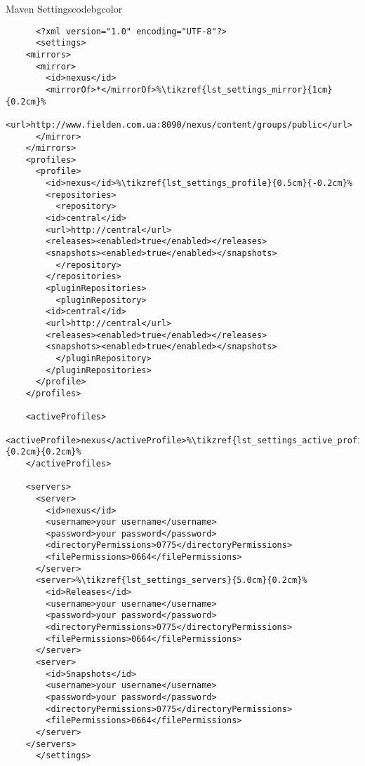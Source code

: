   \begin{code}{Maven Settings}{\label{lst:settings}}{codebgcolor}
    \begin{lstlisting}
      <?xml version="1.0" encoding="UTF-8"?>
      <settings>
	<mirrors>
	  <mirror>
	    <id>nexus</id>
	    <mirrorOf>*</mirrorOf>%\tikzref{lst_settings_mirror}{1cm}{0.2cm}%
	    <url>http://www.fielden.com.ua:8090/nexus/content/groups/public</url>
	  </mirror>
	</mirrors>
	<profiles>
	  <profile>
	    <id>nexus</id>%\tikzref{lst_settings_profile}{0.5cm}{-0.2cm}%
	    <repositories>
	      <repository>
		<id>central</id>
		<url>http://central</url>
		<releases><enabled>true</enabled></releases>
		<snapshots><enabled>true</enabled></snapshots>
	      </repository>
	    </repositories>
	    <pluginRepositories>
	      <pluginRepository>
		<id>central</id>
		<url>http://central</url>
		<releases><enabled>true</enabled></releases>
		<snapshots><enabled>true</enabled></snapshots>
	      </pluginRepository>
	    </pluginRepositories>
	  </profile>
	</profiles>

	<activeProfiles>
	  <activeProfile>nexus</activeProfile>%\tikzref{lst_settings_active_profile}{0.2cm}{0.2cm}%
	</activeProfiles>

	<servers>
	  <server>
	    <id>nexus</id>
	    <username>your username</username>
	    <password>your password</password>
	    <directoryPermissions>0775</directoryPermissions>
	    <filePermissions>0664</filePermissions>
	  </server>
	  <server>%\tikzref{lst_settings_servers}{5.0cm}{0.2cm}%
	    <id>Releases</id>
	    <username>your username</username>
	    <password>your password</password>
	    <directoryPermissions>0775</directoryPermissions>
	    <filePermissions>0664</filePermissions>
	  </server>
	  <server>
	    <id>Snapshots</id>
	    <username>your username</username>
	    <password>your password</password>
	    <directoryPermissions>0775</directoryPermissions>
	    <filePermissions>0664</filePermissions>
	  </server>
	</servers>
      </settings>
    \end{lstlisting}


\end{code}
